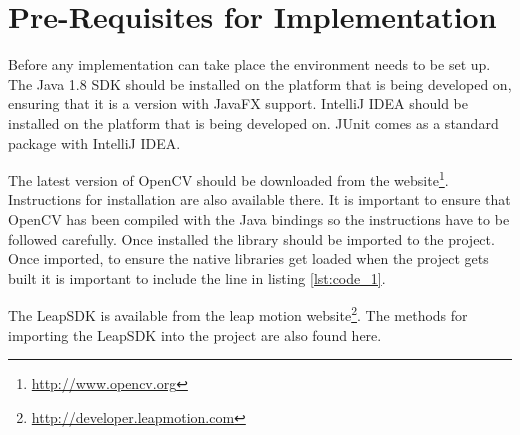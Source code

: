 \documentclass[11pt,oneside]{report}
\begin{document}
	\section{Pre-Requisites for Implementation}
		Before any implementation can take place the environment needs to be set up.
		The Java 1.8 SDK should be installed on the platform that is being developed on, ensuring that it is a version with JavaFX support.
		IntelliJ IDEA should be installed on the platform that is being developed on.
		JUnit comes as a standard package with IntelliJ IDEA.
		
		The latest version of OpenCV should be downloaded from the website\footnote{\url{http://www.opencv.org}}.
		Instructions for installation are also available there.
		It is important to ensure that OpenCV has been compiled with the Java bindings so the instructions have to be followed carefully.
		Once installed the library should be imported to the project. %
		Once imported, to ensure the native libraries get loaded when the project gets built it is important to include the line in listing \ref{lst:code_1}.
		
				
		The LeapSDK is available from the leap motion website\footnote{\url{http://developer.leapmotion.com}}.
		The methods for importing the LeapSDK into the project are also found here.
\end{document}
